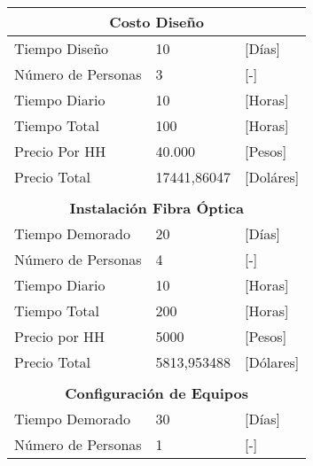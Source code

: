 \newpage
\begin{table}[H]
\begin{tabular}{lll}
\hline
\multicolumn{3}{|c|}{\textbf{Costo Diseño}} \\ \hline
\multicolumn{1}{|l|}{Tiempo Diseño} & \multicolumn{1}{l|}{10} & \multicolumn{1}{l|}{{[}Días{]}} \\ \hline
\multicolumn{1}{|l|}{Número de Personas} & \multicolumn{1}{l|}{3} & \multicolumn{1}{l|}{{[}-{]}} \\ \hline
\multicolumn{1}{|l|}{Tiempo Diario} & \multicolumn{1}{l|}{10} & \multicolumn{1}{l|}{{[}Horas{]}} \\ \hline
\multicolumn{1}{|l|}{Tiempo Total} & \multicolumn{1}{l|}{100} & \multicolumn{1}{l|}{{[}Horas{]}} \\ \hline
\multicolumn{1}{|l|}{Precio Por HH} & \multicolumn{1}{l|}{40.000} & \multicolumn{1}{l|}{{[}Pesos{]}} \\ \hline
\multicolumn{1}{|l|}{Precio Total} & \multicolumn{1}{l|}{17441,86047} & \multicolumn{1}{l|}{{[}Doláres{]}} \\ \hline
 &  &  \\ \hline
\multicolumn{3}{|c|}{\textbf{Instalación Fibra Óptica}} \\ \hline
\multicolumn{1}{|l|}{Tiempo Demorado} & \multicolumn{1}{l|}{20} & \multicolumn{1}{l|}{{[}Días{]}} \\ \hline
\multicolumn{1}{|l|}{Número de Personas} & \multicolumn{1}{l|}{4} & \multicolumn{1}{l|}{{[}-{]}} \\ \hline
\multicolumn{1}{|l|}{Tiempo Diario} & \multicolumn{1}{l|}{10} & \multicolumn{1}{l|}{{[}Horas{]}} \\ \hline
\multicolumn{1}{|l|}{Tiempo Total} & \multicolumn{1}{l|}{200} & \multicolumn{1}{l|}{{[}Horas{]}} \\ \hline
\multicolumn{1}{|l|}{Precio por HH} & \multicolumn{1}{l|}{5000} & \multicolumn{1}{l|}{{[}Pesos{]}} \\ \hline
\multicolumn{1}{|l|}{Precio Total} & \multicolumn{1}{l|}{5813,953488} & \multicolumn{1}{l|}{{[}Dólares{]}} \\ \hline
 &  &  \\ \hline
\multicolumn{3}{|c|}{\textbf{Configuración de Equipos}} \\ \hline
\multicolumn{1}{|l|}{Tiempo Demorado} & \multicolumn{1}{l|}{30} & \multicolumn{1}{l|}{{[}Días{]}} \\ \hline
\multicolumn{1}{|l|}{Número de Personas} & \multicolumn{1}{l|}{1} & \multicolumn{1}{l|}{{[}-{]}} \\ \hline

\end{tabular}
\end{table}
